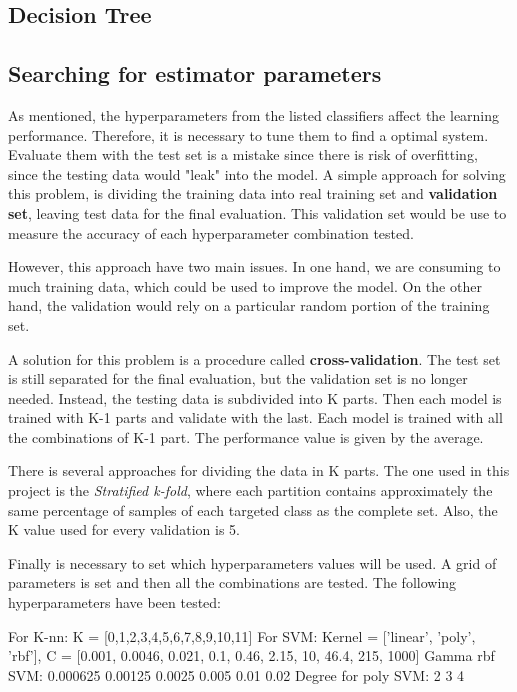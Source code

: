 \subsection*{Decision Tree}

\subsection*{Searching for estimator parameters}

As mentioned, the hyperparameters from the listed classifiers affect the learning performance. Therefore, it is necessary to tune them to find a optimal system. 
Evaluate them with the test set is a mistake since there is risk of overfitting, since the testing data would "leak" into the model. 
A simple approach for solving this problem, is dividing the training data into real training set and \textbf{validation set}, leaving test data for the final evaluation.  This validation set would be use to measure the accuracy of each hyperparameter combination tested.

However, this approach have two main issues. In one hand, we are consuming to much training data, which could be used to improve the model. On the other hand, the validation would rely on a particular random portion of the training set. 

A solution for this problem is a procedure called \textbf{cross-validation}. The test set is still separated for the final evaluation, but the validation set is no longer needed. Instead, the testing data is subdivided into K parts. Then each model is trained with K-1 parts and validate with the last. Each model is trained with all the combinations of K-1 part. The performance value is given by the average. 

There is several approaches for dividing the data in K parts. The one used in this project is the \textit{Stratified k-fold}, where each partition contains approximately the same percentage of samples of each targeted class as the complete set. Also, the K value used for every validation is 5. 

Finally is necessary to set which hyperparameters values will be used. A grid of parameters is set and then all the combinations are tested. The following hyperparameters have been tested:

For K-nn: K = [0,1,2,3,4,5,6,7,8,9,10,11]
For SVM: Kernel = ['linear', 'poly', 'rbf'], C = [0.001, 0.0046, 0.021, 0.1, 0.46, 2.15, 10, 46.4, 215, 1000]
Gamma rbf SVM:  0.000625  0.00125   0.0025    0.005     0.01      0.02   
Degree for poly SVM: 2 3 4

